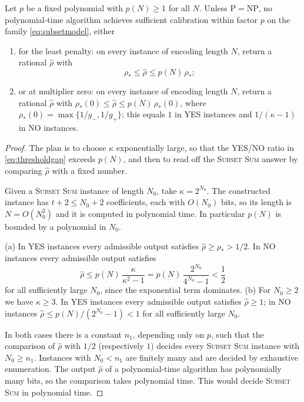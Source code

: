 \begin{theorem}\label{thm:polyfactor}
Let $p$ be a fixed polynomial with $p(N)\ge1$ for all $N$. Unless
$\mathrm P=\mathrm{NP}$, no polynomial-time algorithm achieves sufficient
calibration within factor $p$ on the family \eqref{eq:subsetmodel}, either
\begin{enumerate}
 \item[(a)] for the least penalty: on every instance of encoding length
 $N$, return a rational $\widehat\rho$ with
 \begin{equation}\label{eq:polyfactor}
  \rho_*\le\widehat\rho\le p(N)\,\rho_*;
 \end{equation}
 \item[(b)] or at multiplier zero: on every instance of encoding length $N$,
 return a rational $\widehat\rho$ with
 $\rho_*(0)\le\widehat\rho\le p(N)\,\rho_*(0)$, where
 $\rho_*(0)=\max\{1/g_-,1/g_+\}$; this equals $1$ in YES instances and
 $1/(\kappa-1)$ in NO instances.
\end{enumerate}
\end{theorem}
\begin{proof}
The plan is to choose $\kappa$ exponentially large, so that the YES/NO
ratio in \eqref{eq:thresholdgap} exceeds $p(N)$, and then to read off the
\textsc{Subset Sum} answer by comparing $\widehat\rho$ with a fixed number.

Given a \textsc{Subset Sum} instance of length $N_0$, take
$\kappa=2^{N_0}$. The constructed instance has $t+2\le N_0+2$ coefficients,
each with $O(N_0)$ bits, so its length is $N=O(N_0^2)$ and it is computed
in polynomial time. In particular $p(N)$ is bounded by a polynomial in
$N_0$.

(a) In YES instances every admissible output satisfies
$\widehat\rho\ge\rho_*>1/2$. In NO instances every admissible output
satisfies
\[
 \widehat\rho\le p(N)\,\frac{\kappa}{\kappa^2-1}
 =p(N)\,\frac{2^{N_0}}{4^{N_0}-1}<\frac12
\]
for all sufficiently large $N_0$, since the exponential term dominates.
(b) For $N_0\ge2$ we have $\kappa\ge3$. In YES instances every admissible
output satisfies $\widehat\rho\ge1$; in NO instances
$\widehat\rho\le p(N)/(2^{N_0}-1)<1$ for all sufficiently large $N_0$.

In both cases there is a constant $n_1$, depending only on $p$, such that
the comparison of $\widehat\rho$ with $1/2$ (respectively $1$) decides
every \textsc{Subset Sum} instance with $N_0\ge n_1$. Instances with
$N_0<n_1$ are finitely many and are decided by exhaustive enumeration. The
output $\widehat\rho$ of a polynomial-time algorithm has polynomially many
bits, so the comparison takes polynomial time. This would decide
\textsc{Subset Sum} in polynomial time.
\end{proof}

